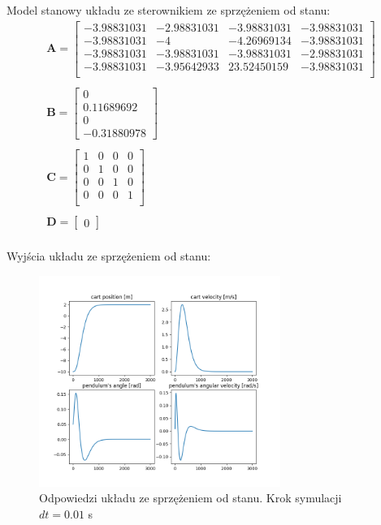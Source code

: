 \documentclass{article}
\begin{document}
Model stanowy układu ze sterownikiem ze sprzężeniem od stanu:
\begin{equation}\label{eq:_statefeedback_ss}
 \begin{array}{l}
  \mathbf{A} = \begin{bmatrix}  -3.98831031 & -2.98831031 & -3.98831031 & -3.98831031 \\
  							   -3.98831031 & -4 & -4.26969134 & -3.98831031 \\
  							   -3.98831031 & -3.98831031 & -3.98831031 & -2.98831031 \\
  							   -3.98831031 & -3.95642933 & 23.52450159 & -3.98831031 \\ 
  			   \end{bmatrix} \\ \\
  			   
  \mathbf{B} = \begin{bmatrix} 0 \\ 0.11689692 \\ 0 \\ -0.31880978 \end{bmatrix} \\ \\
  
  \mathbf{C} = \begin{bmatrix}  1 & 0 & 0 & 0 \\
  							   0 & 1 & 0 & 0 \\
  							   0 & 0 & 1 & 0 \\
  							   0 & 0 & 0 & 1 \\ 
  			   \end{bmatrix} \\ \\
  
  \mathbf{D} = \begin{bmatrix} 0 \end{bmatrix} \\
\end{array}
\end{equation}

Wyjścia układu ze sprzężeniem od stanu:
\begin{figure}[H]
    \centering
    \includegraphics[width=0.7\textwidth]{img/statespace.png}
    \caption{Odpowiedzi układu ze sprzężeniem od stanu. Krok symulacji $dt=0.01$ s}
    \label{fig:state_space}
\end{figure}
\end{document}
